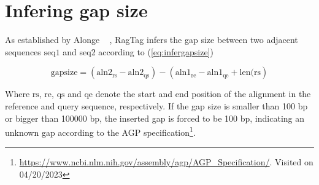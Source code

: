 \section*{Infering gap size} \label{sec:infergapsize}
As established by Alonge \etal ~ \cite{alongeAutomatedAssemblyScaffolding2022}, RagTag infers the gap size between two adjacent sequences $\textrm{seq1}$ and \textrm{seq2} according to (\ref{eq:infergapsize})

\begin{equation}\label{eq:infergapsize}
\textrm{gapsize}  = \left(\textrm{aln2}_\textrm{rs} - \textrm{aln2}_\textrm{qs}\right) - \left(\textrm{aln1}_\textrm{re} - \textrm{aln1}_\textrm{qe} + \textrm{len}(\textrm{rs}\right)
\end{equation}

Where $\textrm{rs}$, $\textrm{re}$, $\textrm{qs}$ and $\textrm{qe}$ denote the start and end position of the alignment in the reference and query sequence, respectively. If the gap size is smaller than 100 bp or bigger than 100000 bp, the inserted gap is forced to be 100 bp, indicating an unknown gap according to the AGP specification\footnote{\url{https://www.ncbi.nlm.nih.gov/assembly/agp/AGP_Specification/}. Visited on 04/20/2023}.